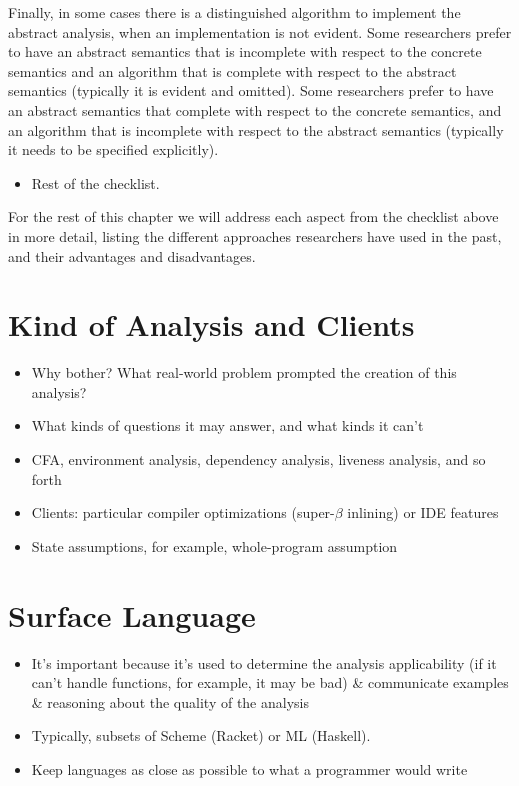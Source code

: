 \documentclass[12pt, oneside]{book}
\begin{document}
Finally, in some cases there is a distinguished algorithm to implement the abstract analysis, when an implementation is not evident. Some researchers prefer to have an abstract semantics that is incomplete with respect to the concrete semantics and an algorithm that is complete with respect to the abstract semantics (typically it is evident and omitted). Some researchers prefer to have an abstract semantics that complete with respect to the concrete semantics, and an algorithm that is incomplete with respect to the abstract semantics (typically it needs to be specified explicitly).

\begin{itemize}
  \item Rest of the checklist.
\end{itemize}

For the rest of this chapter we will address each aspect from the checklist above in more detail, listing the different approaches researchers have used in the past, and their advantages and disadvantages.

\section{Kind of Analysis and Clients}
\label{section:kind-of-analysis-and-clients}

\begin{itemize}
  \item Why bother? What real-world problem prompted the creation of this analysis?
  \item What kinds of questions it may answer, and what kinds it can’t
  \item CFA, environment analysis, dependency analysis, liveness analysis, and so forth
  \item Clients: particular compiler optimizations (super-\(β\) inlining) or IDE features
  \item State assumptions, for example, whole-program assumption
\end{itemize}

\section{Surface Language}
\label{section:surface-language}

\begin{itemize}
  \item It’s important because it’s used to determine the analysis applicability (if it can’t handle functions, for example, it may be bad) \& communicate examples \& reasoning about the quality of the analysis
  \item Typically, subsets of Scheme (Racket) or ML (Haskell).
  \item Keep languages as close as possible to what a programmer would write
\end{itemize}
\end{document}
